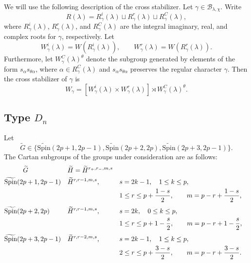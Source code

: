\documentclass{amsart}
\newcommand{\Spin}{{\mathrm{Spin}}}
\theoremstyle{definition}
\newcommand{\calB}{{\mathcal{B}}}
\begin{document}
We will use the following description of the cross stabilizer. Let $\gamma\in\calB_{\lambda,\chi}$. Write
\begin{equation*}
R(\lambda)=R^i_\gamma(\lambda)\sqcup R^r_\gamma(\lambda)\sqcup R^C_\gamma(\lambda),
\end{equation*}
where $R^i_\gamma(\lambda)$, $R^r_\gamma(\lambda)$, and $R^C_\gamma(\lambda)$ are the integral imaginary, real, and complex roots for $\gamma$, respectively. Let
\begin{equation*}
W^i_\gamma(\lambda)=W(R^i_\gamma(\lambda)),
\qquad
W^r_\gamma(\lambda)=W(R^r_\gamma(\lambda)).
\end{equation*}
Furthermore, let $W^C_\gamma(\lambda)^\theta$ denote the subgroup generated by elements of the form $s_\alpha s_{\theta\alpha}$,
where $\alpha\in R^C_\gamma(\lambda)$ and $s_\alpha s_{\theta\alpha}$ preserves the regular character $\gamma$. Then the cross stabilizer of $\gamma$ is
\begin{equation}\label{e:stab}
W_\gamma=
\left[
W^i_\gamma(\lambda)\times W^r_\gamma(\lambda)
\right]
\rtimes
W^C_\gamma(\lambda)^\theta.
\end{equation}

\bigskip
\subsection{Type \(D_n\)}

Let
\[
\widetilde G\in
\{
\widetilde{\Spin}(2p+1,2p-1),
\widetilde{\Spin}(2p+2,2p),
\widetilde{\Spin}(2p+3,2p-1)
\}.
\]
The Cartan subgroups of the groups under consideration are as follows:
\begin{align*}
&\hspace*{1cm}
\widetilde G
&&
\widetilde H=\widetilde H^{r_+,r_-,m,s}
\\
&\widetilde{\Spin}(2p+1,2p-1)
&&
\widetilde H^{r,r-1,m,s},
&
&s=2k-1,\quad 1\leq k\leq p,
\\
&&&&&
1\leq r\leq p+\frac{1-s}{2},
\qquad
m=p-r+\frac{1-s}{2},
\\[1mm]
&\widetilde{\Spin}(2p+2,2p)
&&
\widetilde H^{r,r-1,m,s},
&
&s=2k,\quad 0\leq k\leq p,
\\
&&&&&
1\leq r\leq p+1-\frac{s}{2},
\qquad
m=p-r+1-\frac{s}{2},
\\[1mm]
&\widetilde{\Spin}(2p+3,2p-1)
&&
\widetilde H^{r,r-2,m,s},
&
&s=2k-1,\quad 1\leq k\leq p,
\\
&&&&&
2\leq r\leq p+\frac{3-s}{2},
\qquad
m=p-r+\frac{3-s}{2}.
\end{align*}
\end{document}
